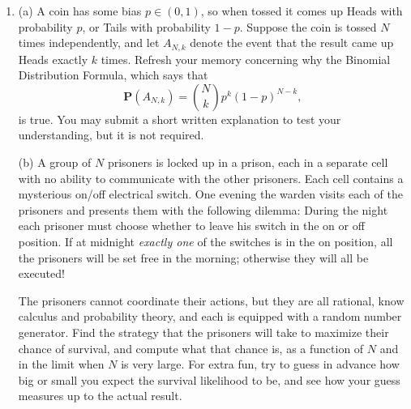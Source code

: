 \documentclass[12pt]{article}
\newcommand{\prob}{\mathbf{P}}
\theoremstyle{example}
\begin{document}
\begin{enumerate}
We say that a pre-probability measure satisfies the \textbf{continuity} properties if it satisfies
\begin{equation} \tag{CONT1} \label{eq:cont1} (A_n)_{n=1}^\infty  \subset {\cal F}, \ \ A_n \subset A_{n+1}\ \forall n \implies \prob(\cup_{n=1}^\infty A_n) = \lim_{n\to\infty} \prob(A_n),
\end{equation}
\begin{equation} \tag{CONT2} \label{eq:cont2} (A_n)_{n=1}^\infty  \subset {\cal F}, \ \ A_n \supset A_{n+1}\ \forall n \implies \prob(\cap_{n=1}^\infty A_n) = \lim_{n\to\infty} \prob(A_n).
\end{equation}
\noindent Prove that a probability measure satisfies the continuity properties, and that an additive pre-probability measure that satisfies the first continuity property \eqref{eq:cont1} (``continuity from below'') is $\sigma$-additive, and is therefore a probability measure.

\item (a) A coin has some bias $p\in (0,1)$, so when tossed it comes up Heads with probability $p$, or Tails with probability $1-p$. Suppose the coin is tossed $N$ times independently, and let $A_{N,k}$ denote the event that the result came up Heads exactly $k$ times. Refresh your memory concerning why the Binomial Distribution Formula, which says that
\begin{equation} \tag{BINOM} \label{eq:binomial} \prob(A_{N,k}) = \binom{N}{k} p^k (1-p)^{N-k}, \end{equation}
is true. You may submit a short written explanation to test your understanding, but it is not required.

\medskip\noindent
(b) A group of $N$ prisoners is locked up in a prison, each in a separate cell with no ability to communicate with the other prisoners. Each cell contains a mysterious on/off electrical switch. One evening the warden visits each of the prisoners and presents them with the following dilemma: During the night each prisoner must choose whether to leave his switch in the on or off position. If at midnight \emph{exactly one} of the switches is in the on position, all the prisoners will be set free in the morning; otherwise they will all be executed!

The prisoners cannot coordinate their actions, but they are all rational, know calculus and probability theory, and each is equipped with a random number generator. Find the strategy that the prisoners will take to maximize their chance of survival, and compute what that chance is, as a function of $N$ and in the limit when $N$ is very large. For extra fun, try to guess in advance how big or small you expect the survival likelihood to be, and see how your guess measures up to the actual result.


\end{enumerate}
\end{document}
